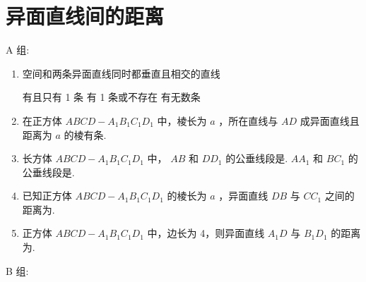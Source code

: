 \section*{异面直线间的距离}

A 组:

\begin{enumerate}

\item 空间和两条异面直线同时都垂直且相交的直线

 {有且只有 1 条} {有 1 条或不存在} {有无数条}

\item 在正方体 $ {ABCD} - {A}_{1}{B}_{1}{C}_{1}{D}_{1} $ 中，棱长为 $ a $ ，所在直线与 $ {AD} $ 成异面直线且距离为 $ a $ 的棱有条.

\item 长方体 $ {{ABCD}} - {{A}}_{1}{{B}}_{1}{{C}}_{1}{{D}}_{1} $ 中， $ {{AB}} $ 和 $ {D{D}_{1}} $ 的公垂线段是. $ {A}{{A}}_{1} $ 和 $ {B}{{C}}_{1} $ 的公垂线段是.

\item 已知正方体 $ {ABCD} - {A}_{1}{B}_{1}{C}_{1}{D}_{1} $ 的棱长为 $ a $ ，异面直线 $ {DB} $ 与 $ C{C}_{1} $ 之间的距离为.

\item 正方体 $ {{ABCD}} - {{A}}_{1}{{B}}_{1}{{C}}_{1}{{D}}_{1} $ 中，边长为 4，则异面直线 $ {{A}}_{1}{D} $ 与 $ {{B}}_{1}{{D}}_{1} $ 的距离为.

    
\end{enumerate}


B 组:

